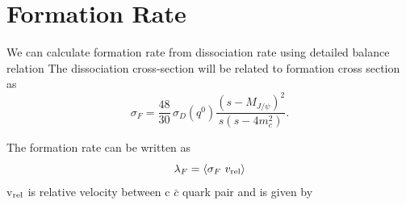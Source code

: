 \documentclass[aps,prc,preprint,superscriptaddress,showpacs,showkeys]{revtex4-1}
\begin{document}




\section{Formation Rate}
We can calculate formation rate from dissociation rate using detailed balance relation \cite{THEWF} 
The dissociation cross-section will be related to formation cross section as
\begin{equation}
\sigma_{F} = \frac{48}{30}\,\sigma_{D}(q^0)\frac{(s-M_{J/\psi})^{2}}{s(s-4m_{c}^{2})}.
\end{equation}


The formation rate can be written as 
\begin{equation}
\lambda_{F} = \langle \sigma_{F} \,\, v_{\rm rel} \rangle
\end{equation}
v$_{\rm rel}$ is relative velocity between c $\bar{c}$ quark pair and is given by
\end{document}
